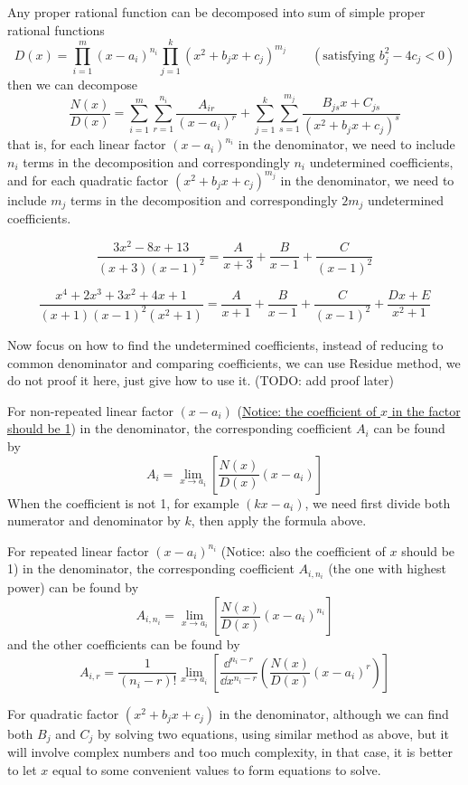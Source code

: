 \documentclass{overview}
\begin{document}
Any proper rational function can be decomposed into sum of simple proper rational functions
\[
	D(x) = \prod_{i=1}^m (x-a_i)^{n_i} \prod_{j=1}^k (x^2 + b_j x + c_j)^{m_j}
	\quad\quad(\text{satisfying }b_j^2 - 4 c_j < 0)
\] 
then we can decompose
\[
	\frac{N(x)}{D(x)} = \sum_{i=1}^m \sum_{r=1}^{n_i} \frac{A_{ir}}{(x-a_i)^r}
	+ \sum_{j=1}^k \sum_{s=1}^{m_j} \frac{B_{js} x + C_{js}}{(x^2 + b_j x + c_j)^s}
\] 
that is, for each linear factor $(x-a_i)^{n_i}$ in the denominator,
we need to include $n_i$ terms in the decomposition and correspondingly $n_i$
undetermined coefficients, and for each quadratic factor $(x^2 + b_j x + c_j)^{m_j}$
in the denominator, we need to include $m_j$ terms in the decomposition and correspondingly
$2 m_j$ undetermined coefficients.
\begin{example}
	\[
		\frac{3x^2-8x+13}{(x+3)(x-1)^2} = \frac{A}{x+3} + \frac{B}{x-1} + \frac{C}{(x-1)^2}
	\]
\end{example}
\begin{example}
	\[
		\frac{x^{4}+2x^{3}+3x^2+4x+1}{(x+1)(x-1)^2(x^2+1)} =
		\frac{A}{x+1} + \frac{B}{x-1} + \frac{C}{(x-1)^2} + \frac{D x + E}{x^2 + 1}
	\]
\end{example}

Now focus on how to find the undetermined coefficients, instead of reducing to
common denominator and comparing coefficients, we can use Residue method, we
do not proof it here, just give how to use it. (TODO: add proof later)

For non-repeated linear factor $(x-a_i)$ (\underline{Notice: the coefficient of $x$ in
the factor should be 1}) in the denominator, the corresponding
coefficient $A_i$ can be found by
\[
	A_i = \lim_{x \to a_i} \left[\frac{N(x)}{D(x)}(x-a_i)\right]
\]
When the coefficient is not 1, for example $(k x - a_i)$, we need first divide both
numerator and denominator by $k$, then apply the formula above.
	
For repeated linear factor $(x-a_i)^{n_i}$ (Notice: also the coefficient of $x$ 
should be 1) in the denominator, the
corresponding coefficient $A_{i, n_i}$ (the one with highest power) can be found by
\[
	A_{i, n_i} = \lim_{x \to a_i} \left[\frac{N(x)}{D(x)}(x-a_i)^{n_i}\right]
\] 
and the other coefficients can be found by
\[
	A_{i, r} = \frac{1}{(n_i - r)!} \lim_{x \to a_i} \left[ \frac{\dd^{n_i - r}}{\dd x^{n_i - r}}
	\left(\frac{N(x)}{D(x)}(x-a_i)^r\right) \right]
\]

For quadratic factor $(x^2 + b_j x + c_j)$ in the denominator, although we can
find both $B_j$ and $C_j$ by solving two equations, using similar method as above,
but it will involve complex numbers and too much complexity, in that case, it
is better to let $x$ equal to some convenient values to form equations to solve.
\end{document}
